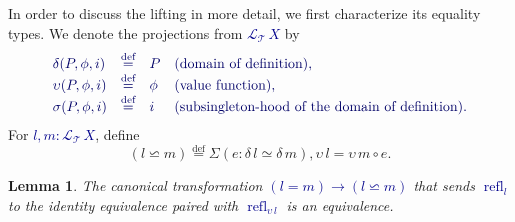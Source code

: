 \documentclass[10pt]{article}
\newcommand{\db}{\textcolor{darkblue}}
\newcommand{\m}[1]{\db{$#1$}}
\newcommand{\M}[1]{\[\db{#1}\]}
\newcommand{\comp}{\mathrel{\circ}}
\newcommand{\T}{\mathcal{T}}
\newcommand{\Lift}{\mathcal{L}}
\newcommand{\refl}{\operatorname{refl}}
\newcommand{\eqdef}{\overset{\text{def}}{=}}
\newtheorem{lemma}[numbered]{Lemma}
\theoremstyle{definition}
\begin{document}
In order to discuss the lifting in more detail, we first characterize
its equality types. We denote the projections from \m{\Lift_{\T}
  \, X} by
%
\M{
  \begin{array}{llll}
    \delta (P , \phi , i) & \eqdef & P & \text{(domain of definition),} \\
    \upsilon (P , \phi , i) & \eqdef & \phi & \text{(value function),} \\
    \sigma(P , \phi , i) & \eqdef & i & \text{(subsingleton-hood of the domain of definition).}
  \end{array}
}
%
For \m{l , m : \Lift_{\T} \, X}, define
\[
  (l \backsimeq m) \eqdef \Sigma (e : \delta \, l \simeq \delta \, m), \upsilon \, l = \upsilon \, m \comp e.
\]
\begin{lemma}
  The canonical transformation \m{(l = m) \to (l \backsimeq m)} that
  sends \m{\refl_l} to the identity equivalence paired with \m{\refl_{\upsilon \,
      l}} is an equivalence.
\end{lemma}
\end{document}
